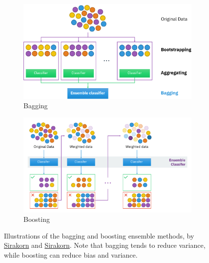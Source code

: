 \begin{figure}[H]
\centering
  \begin{subfigure}[c]{0.48\textwidth}\centering
  \includegraphics[width=\textwidth]{figures/ml/bagging}
  \vspace{0.1cm}
  \caption{Bagging}
  \label{fig:bagging_and_boosting:bagging}
  \end{subfigure}
  \quad
  \begin{subfigure}[c]{0.48\textwidth}\centering
  \includegraphics[width=\textwidth]{figures/ml/boosting}
  \vspace{0.1cm}
  \caption{Boosting}
  \label{fig:bagging_and_boosting:boosting}
  \end{subfigure}
\caption{
Illustrations of the bagging and boosting ensemble methods,
by \href{https://en.wikipedia.org/wiki/File:Ensemble_Bagging.svg}{Sirakorn}
and \href{https://en.wikipedia.org/wiki/File:Ensemble_Boosting.svg}{Sirakorn}.
Note that bagging tends to reduce variance,
while boosting can reduce bias and variance.
}
\label{fig:bagging_and_boosting}
\end{figure}
